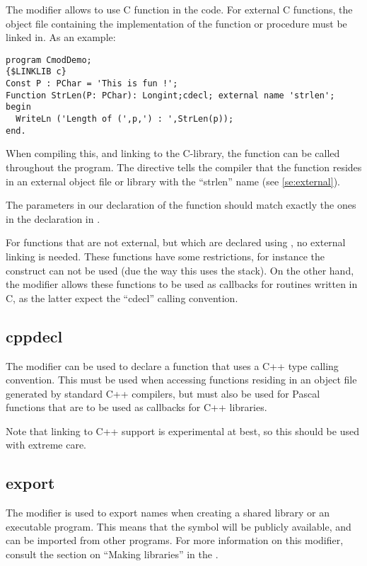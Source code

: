 The  modifier allows to use C function in the code.
For external C functions, the object file containing the 
implementation of the function or procedure must be linked in.
As an example:
\begin{verbatim}
program CmodDemo;
{$LINKLIB c}
Const P : PChar = 'This is fun !';
Function StrLen(P: PChar): Longint;cdecl; external name 'strlen';
begin
  WriteLn ('Length of (',p,') : ',StrLen(p));
end.
\end{verbatim}
When compiling this, and linking to the C-library, the  function
can be called throughout the program. The  directive tells
the compiler that the function resides in an external object file or library
with the ``strlen'' name (see \ref{se:external}).
\begin{remark}
The parameters in our declaration of the  function should
match exactly the ones in the declaration in .
\end{remark}

For functions that are not external, but which are declared using
, no external linking is needed. These functions have some
restrictions, for instance the  construct can not be
used (due the way this uses the stack). On the other hand, the
 modifier allows these functions to be used as callbacks for
routines written in C, as the latter expect the ``cdecl'' calling convention.


\subsection{cppdecl}
\label{se:cppdecl}
The  modifier can be used to declare a function that uses a C++
type calling convention. This must be used when accessing functions residing in
an object file generated by standard C++ compilers, but must also be used for
Pascal functions that are to be used as callbacks for C++ libraries.

Note that linking to C++ support is experimental at best, so this should be used with
extreme care.

\subsection{export}
The  modifier is used to export names when creating a shared library
or an executable program. This means that the symbol will be publicly
available, and can be imported from other programs. For more information
on this modifier, consult the section on ``Making libraries''
in the \progref.

